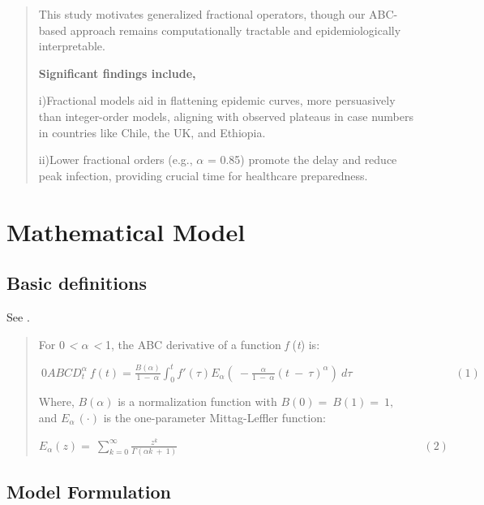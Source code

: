 \documentclass[10pt]{NSP1}
\begin{document}
\begin{quote}
This study motivates generalized fractional operators, though our ABC-based approach remains computationally tractable and epidemiologically interpretable.

\textbf{Significant  findings include,}

i)Fractional models aid in flattening epidemic curves, more persuasively than integer-order models, aligning with observed plateaus in case numbers in countries like Chile, the UK, and Ethiopia.\cite{ref51,ref52,ref53}

ii)Lower fractional orders (e.g., $\alpha$ = 0.85) promote the delay and reduce peak infection, providing crucial time for healthcare preparedness.
\end{quote}

\section{Mathematical Model}

\subsection{Basic definitions}

\noindent See \cite{ref54}.

\begin{quote}
For 0 \emph{\textless{} $\alpha$ \textless{}} 1, the ABC derivative of a function \emph{f} (\emph{t}) is:

\(\ 0ABCD_{t}^{\alpha}\ f(t) = \frac{B(\alpha)}{1\  - \ \alpha}\int_{0}^{t}{}f'(\tau)E_{\alpha}(\  - \frac{\alpha}{1\  - \ \alpha}(t\  - \ \tau)^{\alpha})\ d\tau\ \ \ \ \ \ \ \ \ \ \ \ \ \ \ \ \ \ \ \ \ \ \ \ \ \ \ \ \ \ \ \ \ \ \ \ \ \ \ \ \ (1)\)

Where, \(B(\alpha)\) is a normalization function with \(B(0) = \ B(1) = \ 1,\) and \(E_{\alpha\ }( \cdot )\) is the one-parameter Mittag-Leffler function:

\(E_{\alpha}(z) = \ \sum_{k = 0}^{\infty}{}\frac{z^{k}}{\Gamma(\alpha k\  + \ 1)}\ \ \ \ \ \ \ \ \ \ \ \ \ \ \ \ \ \ \ \ \ \ \ \ \ \ \ \ \ \ \ \ \ \ \ \ \ \ \ \ \ \ \ \ \ \ \ \ \ \ \ \ \ \ \ \ \ \ \ \ \ \ \ \ \ \ \ \ \ \ \ \ \ \ \ \ \ \ \ \ \ \ \ \ \ \ \ \ \ \ \ \ \ \ \ \ \ \ (2)\)
\end{quote}

\subsection{Model Formulation}
\end{document}
